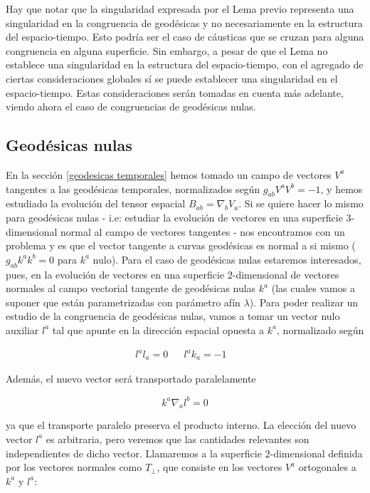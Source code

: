 Hay que notar que la singularidad expresada por el Lema previo representa una singularidad en la congruencia de geodésicas y no necesariamente en la estructura del espacio-tiempo. Esto podría ser el caso de cáusticas que se cruzan para alguna congruencia en alguna superficie. Sin embargo, a pesar de que el Lema no establece una singularidad en la estructura del espacio-tiempo, con el agregado de ciertas consideraciones globales sí se puede establecer una singularidad en el espacio-tiempo. Estas consideraciones serán tomadas en cuenta más adelante, viendo ahora el caso de congruencias de geodésicas nulas.






    
\subsection{Geodésicas nulas}\label{geodesica nulas subsec}


En la sección \ref{geodesicas temporales} hemos tomado un campo de vectores $V^a$ tangentes a las geodésicas temporales, normalizados según $g_{ab}V^aV^b=-1$, y hemos estudiado la evolución del tensor espacial $B_{ab}=\nabla_bV_a$. Si se quiere hacer lo mismo para geodésicas nulas - i.e: estudiar la evolución de vectores en una superficie 3-dimensional normal al campo de vectores tangentes - nos encontramos con un problema y es que el vector tangente a curvas geodésicas es normal a si mismo ($g_{ab}k^ak^b=0$ para $k^a$ nulo). Para el caso de geodésicas nulas estaremos interesados, pues, en la evolución de vectores en una superficie 2-dimensional de vectores  normales al campo vectorial tangente de geodésicas nulas $k^a$ (las cuales vamos a suponer que están parametrizadas con parámetro afín $\lambda$). Para poder realizar un estudio de la congruencia de geodésicas nulas, vamos a tomar un vector nulo auxiliar $l^a$ tal que apunte en la dirección espacial opuesta a $k^a$, normalizado según 

\begin{align*}
    l^al_a=0&   &l^ak_a=-1&
\end{align*}

Además, el nuevo vector será transportado paralelamente 

\[ k^a\nabla_al^b=0 \]

ya que el transporte paralelo preserva el producto interno. La elección del nuevo vector $l^a$ es arbitraria, pero veremos que las cantidades relevantes son independientes de dicho vector. Llamaremos a la superficie 2-dimensional definida por los vectores normales como $T_\perp$, que consiste en los vectores $V^a$ ortogonales a $k^a$ y $l^a$:


